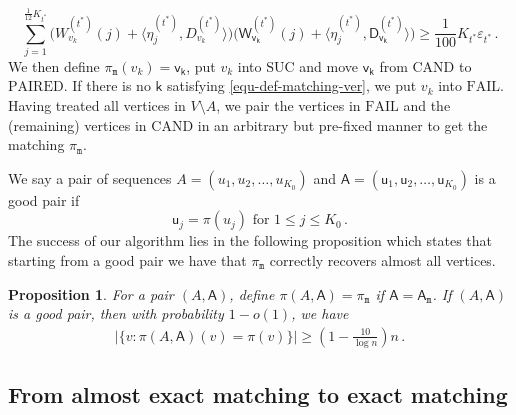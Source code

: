 \documentclass[11pt]{article}
\newtheorem{Proposition}[Theorem]{Proposition}
\numberwithin{equation}{section}
\begin{document}
\begin{equation}
    \sum_{j=1}^{\frac{1}{12}K_{t^*}} \big(  W^{(t^*)}_{v_k}(j) + \langle \eta^{(t^*)}_j, D^{(t^*)}_{v_k} \rangle \big) \big(  \mathsf{W}^{(t^*)}_{\mathsf{v}_{\mathsf{k}}}(j) + \langle \eta^{(t^*)}_j, \mathsf{D}^{(t^*)}_{\mathsf{v}_{\mathsf{k}}} \rangle \big) \geq \frac{1}{100} K_{t^{*}} \varepsilon_{t^{*}}\,.
    \label{equ-def-matching-ver}
\end{equation}
We then define $\pi_{\mathtt{m}}(v_k) = \mathsf{v}_{\mathsf{k}}$, put $v_k$ into $\mathrm{SUC}$ and move $\mathsf{v}_{\mathsf{k}}$ from $\mathrm{CAND}$ to $\mathrm{PAIRED}$. If there is no $\mathsf{k}$ satisfying \eqref{equ-def-matching-ver}, we put $v_k$ into $\mathrm{FAIL}$. Having treated all vertices in $V \setminus A$, we pair the vertices in $\mathrm{FAIL}$ and the (remaining) vertices in $\mathrm{CAND}$ in an arbitrary but pre-fixed manner to get the matching $\pi_{\mathtt{m}}$.

We say a pair of sequences $A = (u_1,u_2,\ldots, u_{K_0})$ and $\mathsf A = (\mathsf{u}_1, \mathsf{u}_2, \ldots, \mathsf{u}_{K_0} )$ is a good pair if
\begin{equation}\label{eq-correct-seeds}
    \mathsf{u}_j = \pi(u_j) \mbox{ for } 1 \leq j \leq K_0\,.
\end{equation}
The success of our algorithm lies in the following proposition which states that starting from a good pair we have that $\pi_{\mathtt{m}}$ correctly recovers almost all vertices. 
\begin{Proposition}{\label{prop-almost-exact-matching}}
    For a pair $(A, \mathsf A)$, define $\pi(A, \mathsf A) = \pi_{\mathtt m}$ if $\mathsf A = \mathsf A_{\mathtt m}$. If $(A, \mathsf A)$ is a good pair, then with probability $1-o(1)$, we have 
   \begin{align*}
       | \{ v: {\pi}(A,\mathsf{A})(v) = \pi(v) \} | \geq (1-\frac{10}{\log n}) n \,.
   \end{align*}
\end{Proposition}





\subsection{From almost exact matching to exact matching}
\label{sec:seeded-matching}
\end{document}
